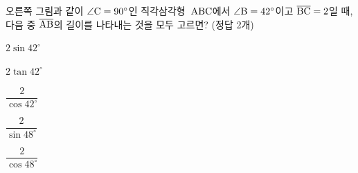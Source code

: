 \noindent\begin{minipage}[t]{0.58\linewidth}\vspace{0pt}\raggedright 오른쪽 그림과 같이 $\angle\mathrm{C}=90^\circ$인 직각삼각형~$\mathrm{ABC}$에서 $\angle\mathrm{B}=42^\circ$이고 $\overline{\mathrm{BC}}=2$일 때, 다음 중 $\overline{\mathrm{AB}}$의 길이를 나타내는 것을 모두 고르면? (정답 2개)\end{minipage}\hfill\begin{minipage}[t]{0.4\linewidth}\vspace{0pt}\centering \resizebox{\ifdim\width>\linewidth\linewidth\else\width\fi}{!}{}\end{minipage}\par
\begin{choices32}{\rule[-3ex]{0pt}{8ex}$2\sin 42^\circ$}{\rule[-3ex]{0pt}{8ex}$2\tan 42^\circ$}{\rule[-3ex]{0pt}{8ex}$\dfrac{2}{\cos 42^\circ}$}{\rule[-3ex]{0pt}{8ex}$\dfrac{2}{\sin 48^\circ}$}{\rule[-3ex]{0pt}{8ex}$\dfrac{2}{\cos 48^\circ}$}\end{choices32}
